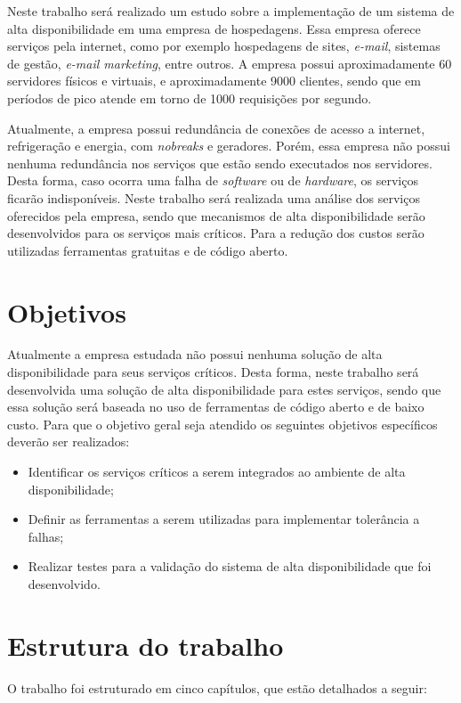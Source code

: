 Neste trabalho será realizado um estudo sobre a implementação de um sistema de alta disponibilidade em uma empresa de hospedagens. 
Essa empresa oferece serviços pela internet, como por exemplo hospedagens de sites, \textit{e-mail}, sistemas de gestão, \textit{e-mail marketing}, 
entre outros. A empresa possui aproximadamente 60 servidores físicos e virtuais, e aproximadamente 9000 clientes, 
sendo que em períodos de pico atende em torno de 1000 requisições por segundo. 

Atualmente, a empresa possui redundância de conexões de acesso a internet, refrigeração e energia, com \textit{nobreaks} e geradores. 
Porém, essa empresa não possui nenhuma redundância nos serviços que estão sendo executados nos servidores. Desta forma, caso ocorra 
uma falha de \textit{software} ou de \textit{hardware}, os serviços ficarão indisponíveis. Neste trabalho será realizada uma análise dos 
serviços oferecidos pela empresa, sendo que mecanismos de alta disponibilidade serão desenvolvidos para os serviços mais críticos. 
Para a redução dos custos serão utilizadas ferramentas gratuitas e de código aberto.

\section{Objetivos}
Atualmente a empresa estudada não possui nenhuma solução de alta disponibilidade para seus serviços críticos. Desta forma, neste trabalho 
será desenvolvida uma solução de alta disponibilidade para estes serviços, sendo que essa solução será baseada no uso de ferramentas de 
código aberto e de baixo custo. Para que o objetivo geral seja atendido os seguintes objetivos específicos deverão ser realizados:

\begin{itemize}
\item Identificar os serviços críticos a serem integrados ao ambiente de alta disponibilidade;
\item Definir as ferramentas a serem utilizadas para implementar tolerância a falhas;
\item Realizar testes para a validação do sistema de alta disponibilidade que foi desenvolvido.
\end{itemize}

\section{Estrutura do trabalho}
O trabalho foi estruturado em cinco capítulos, que estão detalhados a seguir:

